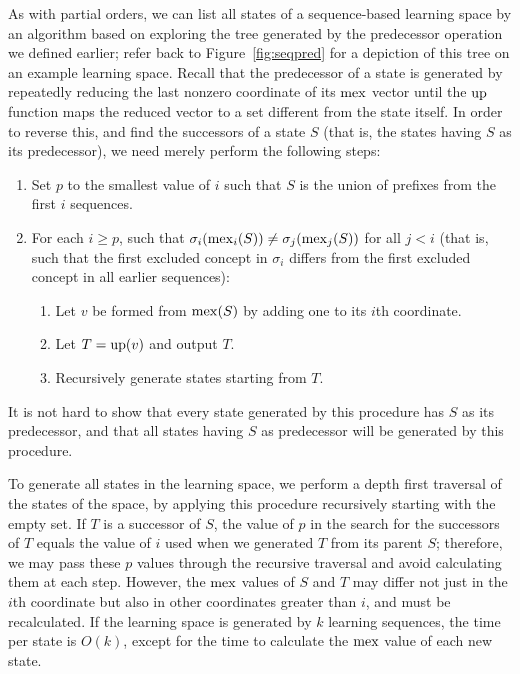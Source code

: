\documentclass[11pt]{llncs}
\begin{document}
{As with partial orders, we can list all states of a sequence-based learning space by an algorithm based on exploring the tree generated by the predecessor operation we defined earlier; refer back to Figure~\ref{fig:seqpred} for a depiction of this tree on an example learning space.
Recall that the predecessor of a state is generated by repeatedly reducing the last nonzero coordinate of its ${\rm mex}$ vector until the ${\rm up}$ function maps the reduced vector to a set different from the state itself. In order to reverse this, and find the successors of a state $S$ (that is, the states having $S$ as its predecessor), we need merely perform the following steps:

\begin{enumerate}
\item Set $p$ to the smallest value of $i$ such that $S$ is the union of prefixes from the first $i$ sequences.
\item For each $i\ge p$, such that $\sigma_i({\rm mex}_i(S))\ne \sigma_j({\rm mex}_j(S))$ for all $j<i$
(that is, such that the first excluded concept in $\sigma_i$ differs from the first excluded
concept in all earlier sequences):
\begin{enumerate}
\item Let $v$ be formed from ${\rm mex}(S)$ by adding one to its $i$th coordinate.
\item Let $T={\rm up}(v)$ and output $T$.
\item Recursively generate states starting from $T$.
\end{enumerate}
\end{enumerate}

\noindent
It is not hard to show that every state generated by this procedure has $S$ as its predecessor, and that all states having $S$ as predecessor will be generated by this procedure.

To generate all states in the learning space, we perform a depth first traversal of the states of the space, by applying this procedure recursively starting with the empty set.
If $T$ is a successor of $S$, the value of $p$ in the search for the successors of $T$ equals the value of $i$ used when we generated $T$ from its parent $S$; therefore, we may pass these $p$ values through the recursive traversal and avoid calculating them at each step.  However, the ${\rm mex}$ values of $S$ and $T$ may differ not just in the $i$th coordinate but also in other coordinates greater than $i$, and must be recalculated.
If the learning space is generated by $k$ learning sequences, the time per state is $O(k)$,
except for the time to calculate the ${\rm mex}$ value of each new state.

}
\end{document}
